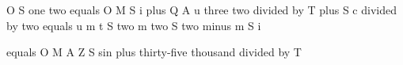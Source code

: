 O S one two equals O M S i plus Q A u three two divided by T plus S c divided by two equals u m t S two m two S two minus m S i

equals O M A Z S sin plus thirty-five thousand divided by T